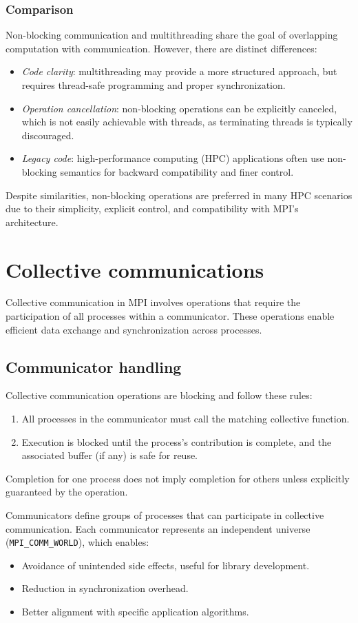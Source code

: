 \subsubsection{Comparison}
Non-blocking communication and multithreading share the goal of overlapping computation with communication. However, there are distinct differences:
\begin{itemize}
    \item \textit{Code clarity}: multithreading may provide a more structured approach, but requires thread-safe programming and proper synchronization.
    \item \textit{Operation cancellation}: non-blocking operations can be explicitly canceled, which is not easily achievable with threads, as terminating threads is typically discouraged.
    \item \textit{Legacy code}: high-performance computing (HPC) applications often use non-blocking semantics for backward compatibility and finer control.
\end{itemize}
Despite similarities, non-blocking operations are preferred in many HPC scenarios due to their simplicity, explicit control, and compatibility with MPI's architecture.

\section{Collective communications}
Collective communication in MPI involves operations that require the participation of all processes within a communicator. 
These operations enable efficient data exchange and synchronization across processes. 

\subsection{Communicator handling}
Collective communication operations are blocking and follow these rules:
\begin{enumerate}
    \item All processes in the communicator must call the matching collective function.
    \item Execution is blocked until the process's contribution is complete, and the associated buffer (if any) is safe for reuse.
\end{enumerate}
Completion for one process does not imply completion for others unless explicitly guaranteed by the operation.

Communicators define groups of processes that can participate in collective communication. 
Each communicator represents an independent universe (\texttt{MPI\_COMM\_WORLD}), which enables:
\begin{itemize}
    \item Avoidance of unintended side effects, useful for library development.
    \item Reduction in synchronization overhead.
    \item Better alignment with specific application algorithms.
\end{itemize}

